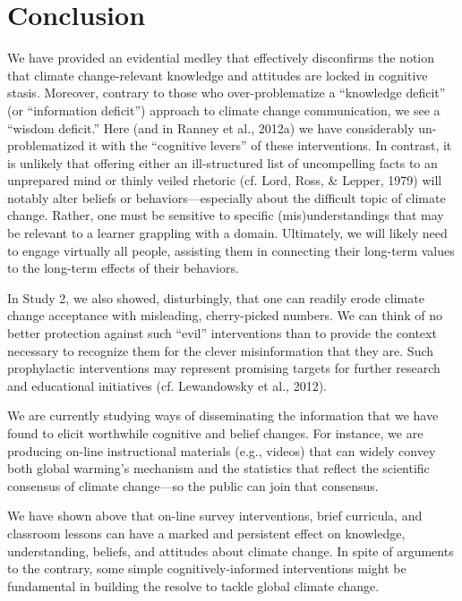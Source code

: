 \graphicspath{{conclusion/}}

\chapter{Conclusion}
\label{chap:conclusion}

We have provided an evidential medley that effectively disconfirms the notion
that climate change-relevant knowledge and attitudes are locked in cognitive
stasis. Moreover, contrary to those who over-problematize a ``knowledge deficit''
(or ``information deficit'') approach to climate change communication, we see a
``wisdom deficit.'' Here (and in Ranney et al., 2012a) we have considerably
un-problematized it with the ``cognitive levers'' of these interventions. In
contrast, it is unlikely that offering either an ill-structured list of
uncompelling facts to an unprepared mind or thinly veiled rhetoric (cf. Lord,
Ross, \& Lepper, 1979) will notably alter beliefs or behaviors––especially about
the difficult topic of climate change. Rather, one must be sensitive to specific
(mis)understandings that may be relevant to a learner grappling with a domain.
Ultimately, we will likely need to engage virtually all people, assisting them
in connecting their long-term values to the long-term effects of their
behaviors.

In Study 2, we also showed, disturbingly, that one can readily erode climate
change acceptance with misleading, cherry-picked numbers. We can think of no
better protection against such ``evil'' interventions than to provide the context
necessary to recognize them for the clever misinformation that they are. Such
prophylactic interventions may represent promising targets for further research
and educational initiatives (cf. Lewandowsky et al., 2012).

We are currently studying ways of disseminating the information that we have
found to elicit worthwhile cognitive and belief changes.  For instance, we are
producing on-line instructional materials (e.g., videos) that can widely convey
both global warming’s mechanism and the statistics that reflect the scientific
consensus of climate change—so the public can join that consensus.

We have shown above that on-line survey interventions, brief curricula, and
classroom lessons can have a marked and persistent effect on knowledge,
understanding, beliefs, and attitudes about climate change. In spite of
arguments to the contrary, some simple cognitively-informed interventions might
be fundamental in building the resolve to tackle global climate change.


